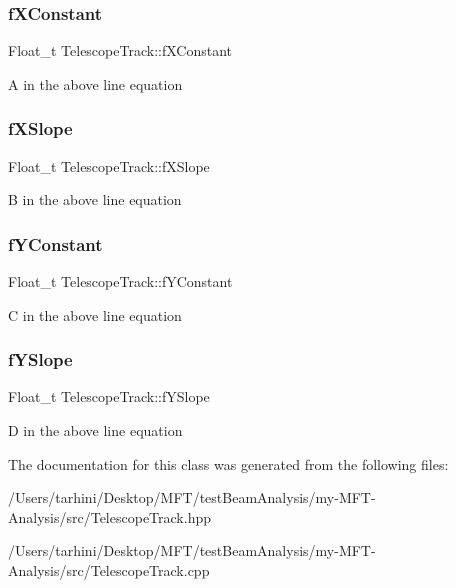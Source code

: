 \subsubsection{\texorpdfstring{f\+X\+Constant}{fXConstant}}
{\footnotesize\ttfamily Float\+\_\+t Telescope\+Track\+::f\+X\+Constant\hspace{0.3cm}{\ttfamily [private]}}

A in the above line equation \mbox{\label{class_telescope_track_a14fdd27ed94d2b69730e56fd2fbbc0ef}} 
\subsubsection{\texorpdfstring{f\+X\+Slope}{fXSlope}}
{\footnotesize\ttfamily Float\+\_\+t Telescope\+Track\+::f\+X\+Slope\hspace{0.3cm}{\ttfamily [private]}}

B in the above line equation \mbox{\label{class_telescope_track_a8e5aa9428a73c38ce626d89bad494ec1}} 
\subsubsection{\texorpdfstring{f\+Y\+Constant}{fYConstant}}
{\footnotesize\ttfamily Float\+\_\+t Telescope\+Track\+::f\+Y\+Constant\hspace{0.3cm}{\ttfamily [private]}}

C in the above line equation \mbox{\label{class_telescope_track_aa522f83a156341cd06a868c9f4692953}} 
\subsubsection{\texorpdfstring{f\+Y\+Slope}{fYSlope}}
{\footnotesize\ttfamily Float\+\_\+t Telescope\+Track\+::f\+Y\+Slope\hspace{0.3cm}{\ttfamily [private]}}

D in the above line equation 

The documentation for this class was generated from the following files\+:\begin{DoxyCompactItemize}
\item 
/\+Users/tarhini/\+Desktop/\+M\+F\+T/test\+Beam\+Analysis/my-\/\+M\+F\+T-\/\+Analysis/src/Telescope\+Track.\+hpp\item 
/\+Users/tarhini/\+Desktop/\+M\+F\+T/test\+Beam\+Analysis/my-\/\+M\+F\+T-\/\+Analysis/src/Telescope\+Track.\+cpp\end{DoxyCompactItemize}
